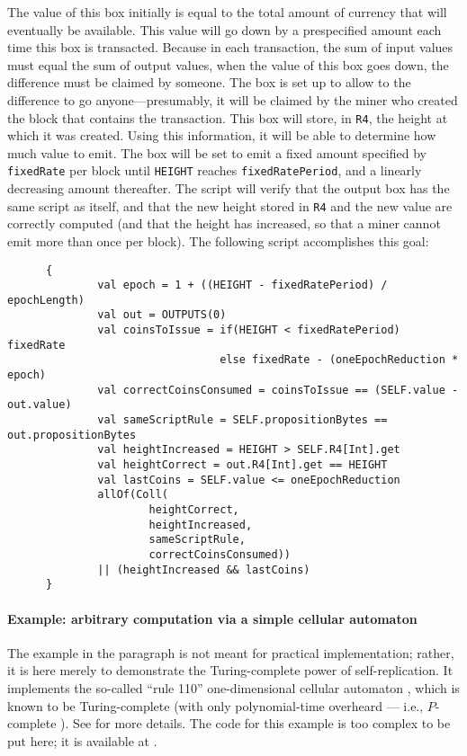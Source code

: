 \documentclass[11pt]{article}
\newcommand{\authnote}[2]{\marginpar{\parbox{\marginparwidth}{\tiny %
  \textsf{#1 {\textcolor{blue}{notes: #2}}}}}%
  \textcolor{blue}{\textbf{\dag}}}
\newcommand{\authnote}[2]{
  \textsf{#1 \textcolor{blue}{: #2}}}
\newcommand{\authnote}[2]{}
\newcommand{\lnote}[1]{{\authnote{\textcolor{orange}{Leo notes}}{#1}}}
\newcommand{\langname}{ErgoScript\xspace}
\begin{document}
The value of this box initially is equal to the total amount of currency that will eventually be available. This value will go down by a prespecified amount each time this box is transacted. Because in each transaction, the sum of input values must equal the sum of output values, when the value of this box goes down, the difference must be claimed by someone. The box is set up to allow to the difference to go anyone---presumably, it will be claimed by the miner who created the block that contains the transaction. This box will store, in \texttt{R4}, the height at which it was created. Using this information, it will be able to determine how much value to emit. The box will be set to emit 
a fixed amount specified by \texttt{fixedRate} per block until \texttt{HEIGHT} reaches \texttt{fixedRatePeriod}, and a linearly decreasing amount thereafter. The script will verify that the output box has the same script as itself, and that the new height stored in \texttt{R4} and the new value are correctly computed (and that the height has increased, so that a miner cannot emit more than once per block). The following script accomplishes this goal:
\begin{verbatim}
      {
              val epoch = 1 + ((HEIGHT - fixedRatePeriod) / epochLength)
              val out = OUTPUTS(0)
              val coinsToIssue = if(HEIGHT < fixedRatePeriod) fixedRate 
                                 else fixedRate - (oneEpochReduction * epoch)
              val correctCoinsConsumed = coinsToIssue == (SELF.value - out.value)
              val sameScriptRule = SELF.propositionBytes == out.propositionBytes
              val heightIncreased = HEIGHT > SELF.R4[Int].get
              val heightCorrect = out.R4[Int].get == HEIGHT
              val lastCoins = SELF.value <= oneEpochReduction
              allOf(Coll(
                      heightCorrect, 
                      heightIncreased, 
                      sameScriptRule,
                      correctCoinsConsumed))
              || (heightIncreased && lastCoins)
      }
\end{verbatim}


\paragraph{Example: arbitrary computation via a simple cellular automaton}
The example in the paragraph is not meant for practical implementation; rather, it is here merely to demonstrate the Turing-complete power of self-replication. It implements the so-called ``rule 110'' one-dimensional cellular automaton \cite{wolfram1986theory}, which is known to be Turing-complete \cite{cook2004universality} (with only polynomial-time overheard --- i.e., $P$-complete \cite{NW06}). See \cite{CKM18}  for more details. The code for this example is too complex to be put here; it is available at \lnote{give a reference to the code once it is written in our \langname and is sitting online somewhere}. 
\end{document}
